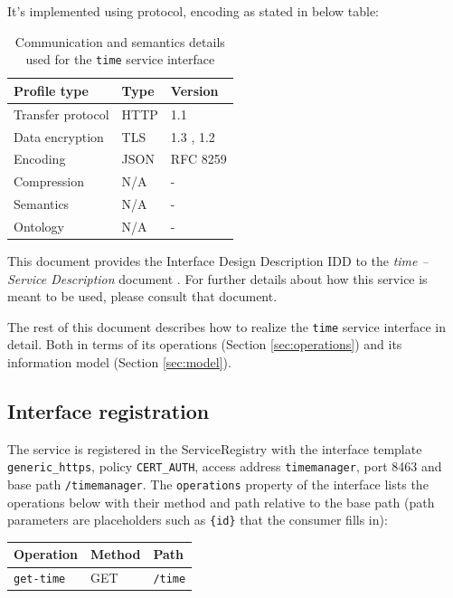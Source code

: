 \documentclass[a4paper]{arrowhead}
\begin{document}
It's implemented using protocol, encoding as stated in below table:
\begin{table}[ht!]
  \centering
  \begin{tabular}{|l|l|l|}
    \hline
    \rowcolor{gray!33} Profile type & Type & Version \\ \hline
    Transfer protocol & HTTP & 1.1 \cite{rfc9112} \\ \hline
    Data encryption & TLS & 1.3 \cite{rfc8446}, 1.2 \cite{rfc5246} \\ \hline
    Encoding & JSON & RFC 8259 \cite{rfc8259} \\ \hline
    Compression & N/A & - \\ \hline
    Semantics & N/A & - \\ \hline
    Ontology & N/A & - \\ \hline
  \end{tabular}
  \caption{Communication and semantics details used for the \texttt{time} service interface}
  \label{tab:comunication_semantics_profile}
\end{table}

This document provides the Interface Design Description IDD to the \textit{time -- Service Description} document \cite{tim-time-sd}.
For further details about how this service is meant to be used, please consult that document.

The rest of this document describes how to realize the \texttt{time} service
interface in detail. Both in terms of its operations (Section \ref{sec:operations}) and its information model (Section \ref{sec:model}).

\subsection{Interface registration}

The service is registered in the ServiceRegistry with the interface template \texttt{generic\_\allowbreak{}https}, policy \texttt{CERT\_\allowbreak{}AUTH}, access address \texttt{timemanager}, port 8463 and base path \texttt{/\allowbreak{}timemanager}. The \texttt{operations} property of the interface lists the operations below with their method and path relative to the base path (path parameters are placeholders such as \texttt{\{id\}} that the consumer fills in):

\noindent\begin{longtable}{| p{5.2cm} | p{1.6cm} | p{8.4cm} |} \hline
\rowcolor{gray!33} Operation & Method & Path \\ \hline \endhead
\texttt{get-\allowbreak{}time} & GET & \texttt{/\allowbreak{}time} \\ \hline
\end{longtable}
\end{document}
